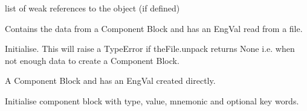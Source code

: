 \documentclass[letterpaper,10pt,english]{sphinxmanual}
\begin{document}
\begin{fulllineitems}
\begin{fulllineitems}
\end{fulllineitems}


\begin{fulllineitems}
\label{\detokenize{ref/LIS/core/LogiRec:TotalDepth.LIS.core.LogiRec.CbEngVal.__weakref__}}
list of weak references to the object (if defined)

\end{fulllineitems}


\end{fulllineitems}


\begin{fulllineitems}
\label{\detokenize{ref/LIS/core/LogiRec:TotalDepth.LIS.core.LogiRec.CbEngValRead}}
Contains the data from a Component Block and has an EngVal read from a file.

\begin{fulllineitems}
\label{\detokenize{ref/LIS/core/LogiRec:TotalDepth.LIS.core.LogiRec.CbEngValRead.__init__}}
Initialise. This will raise a TypeError if theFile.unpack returns None
i.e. when not enough data to create a Component Block.

\end{fulllineitems}


\end{fulllineitems}


\begin{fulllineitems}
\label{\detokenize{ref/LIS/core/LogiRec:TotalDepth.LIS.core.LogiRec.CbEngValWrite}}
A Component Block and has an EngVal created directly.

\begin{fulllineitems}
\label{\detokenize{ref/LIS/core/LogiRec:TotalDepth.LIS.core.LogiRec.CbEngValWrite.__init__}}
Initialise component block with type, value, mnemonic and optional key words.

\end{fulllineitems}


\end{fulllineitems}
\end{document}
